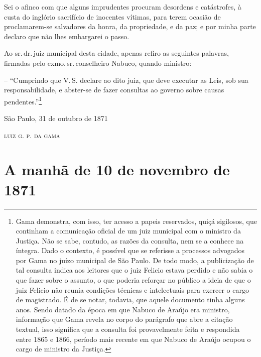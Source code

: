 Sei o afinco com que alguns imprudentes procuram desordens e
catástrofes, à custa do inglório sacrifício de inocentes vítimas, para
terem ocasião de proclamarem-se salvadores da honra, da propriedade, e
da paz; e por minha parte declaro que não lhes embargarei o passo.

Ao sr.\,dr.\,juiz municipal desta cidade, apenas refiro as seguintes
palavras, firmadas pelo exmo.\,sr.\,conselheiro Nabuco, quando ministro:

-- ``Cumprindo que V.\,S. declare ao dito juiz, que deve executar as Leis,
sob sua responsabilidade, e abster-se de fazer consultas ao governo
sobre causas pendentes.''\footnote{ Gama demonstra, com isso, ter acesso
  a papeis reservados, quiçá sigilosos, que continham a comunicação
  oficial de um juiz municipal com o ministro da Justiça. Não se sabe,
  contudo, as razões da consulta, nem se a conhece na íntegra. Dado o
  contexto, é possível que se referisse a processos advogados por Gama
  no juízo municipal de São Paulo. De todo modo, a publicização de tal
  consulta indica aos leitores que o juiz Felicio estava perdido e não
  sabia o que fazer sobre o assunto, o que poderia reforçar no público a
  ideia de que o juiz Felicio não reunia condições técnicas e
  intelectuais para exercer o cargo de magistrado. É de se notar,
  todavia, que aquele documento tinha alguns anos. Sendo datado da época
  em que Nabuco de Araújo era ministro, informação que Gama revela no
  corpo do parágrafo que abre a citação textual, isso significa que a
  consulta foi provavelmente feita e respondida entre 1865 e 1866,
  período mais recente em que Nabuco de Araújo ocupou o cargo de
  ministro da Justiça.}

\begin{flushright}
São Paulo, 31 de outubro de 1871

\textsc{luiz g. p. da gama}
\end{flushright}

\part{A manhã de 10 de novembro de 1871}


